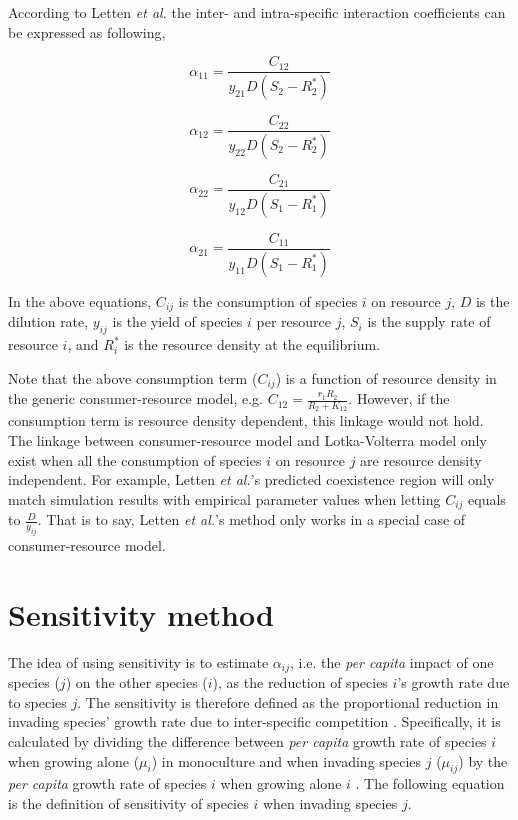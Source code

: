 \documentclass[fleqn]{article}
\begin{document}
According to Letten \textit{et al.} the inter- and intra-specific interaction coefficients can be expressed as following, 

\begin{equation}\label{eq:9}
 \alpha_{11} = \frac{C_{12}}{y_{21} D (S_2 - R^*_2)} 
\end{equation}

\begin{equation}\label{eq:10}
 \alpha_{12} = \frac{C_{22}}{y_{22} D (S_2 - R^*_2)} 
\end{equation}

\begin{equation}\label{eq:11}
 \alpha_{22} = \frac{C_{21}}{y_{12} D (S_1 - R^*_1)} 
\end{equation}

\begin{equation}\label{eq:12}
 \alpha_{21} = \frac{C_{11}}{y_{11} D (S_1 - R^*_1)} 
\end{equation}

\noindent In the above equations, $C_{ij}$ is the consumption of species $i$ on resource $j$, $D$ is the dilution rate, $y_{ij}$ is the yield of species $i$ per resource $j$, $S_{i}$ is the supply rate of resource $i$, and $R^*_i$ is the resource density at the equilibrium. 

Note that the above consumption term ($C_{ij}$) is a function of resource density in the generic consumer-resource model, e.g. $C_{12} = \frac{r_1R_2}{R_2 + K_{12}}$. However, if the consumption term is resource density dependent, this linkage would not hold. The linkage between consumer-resource model and Lotka-Volterra model only exist when all the consumption of species $i$ on resource $j$ are resource density independent. For example, Letten \textit{et al.}'s predicted coexistence region will only match simulation results with empirical parameter values when letting $C_{ij}$ equals to $\frac{D}{y_{ij}}$. That is to say, Letten \textit{et al.}'s method only works in a special case of consumer-resource model.  
 
\newpage
\section{Sensitivity method}

The idea of using sensitivity is to estimate $\alpha_{ij}$, i.e. the \textit{per capita} impact of one species ($j$) on the other species ($i$), as the reduction of species $i$'s growth rate due to species $j$. The sensitivity is therefore defined as the proportional reduction in invading species' growth rate due to inter-specific competition \cite{Carroll2011}. Specifically, it is calculated by dividing the difference between \textit{per capita} growth rate of species $i$ when growing alone ($\mu_{i}$) in monoculture and when invading species $j$ ($\mu_{ij}$) by the \textit{per capita} growth rate of species $i$ when growing alone $i$ \cite{Carroll2011, Narwani2013}. The following equation is the definition of sensitivity of species $i$ when invading species $j$. 
\end{document}
